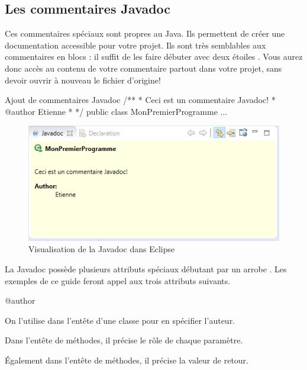 \documentclass[12pt]{report}
\newcommand{\commande}[1]{%
\tcbox[on line, size=fbox, colframe=black, boxrule=0.75pt, tcbox raise base]{#1} %
}
\begin{document}
\subsection{Les commentaires Javadoc}
%
%
Ces commentaires spéciaux sont propres au Java. Ils permettent de créer une documentation accessible pour votre projet. Ils sont très semblables aux commentaires en blocs : il suffit de les faire débuter avec deux étoiles \commande{/**}. Vous aurez donc accès au contenu de votre commentaire partout dans votre projet, sans devoir ouvrir à nouveau le fichier d'origine!
%
%
\begin{MyTCB}{Ajout de commentaires Javadoc}
/**
 * Ceci est un commentaire Javadoc!
 * @author Etienne
 *
 */
public class MonPremierProgramme { ... }
\end{MyTCB}
%
%
\begin{figure}[!ht]
	\centering
	\includegraphics[scale=1]{javadoc-eclipse.png}
	\caption{Visualisation de la Javadoc dans Eclipse}
\end{figure}
%
%
La Javadoc possède plusieurs attributs spéciaux débutant par un arrobe \commande{@}. Les exemples de ce guide feront appel aux trois attributs suivants.

\begin{labeling}{@author\ }

\item[\textbf{@author}] On l'utilise dans l'entête d'une classe pour en spécifier l'auteur.
\item[\textbf{@param}] Dans l'entête de méthodes, il précise le rôle de chaque paramètre.
\item[\textbf{@return}] Également dans l'entête de méthodes, il précise la valeur de retour.

\end{labeling}
%





%
%
%
%
\end{document}

